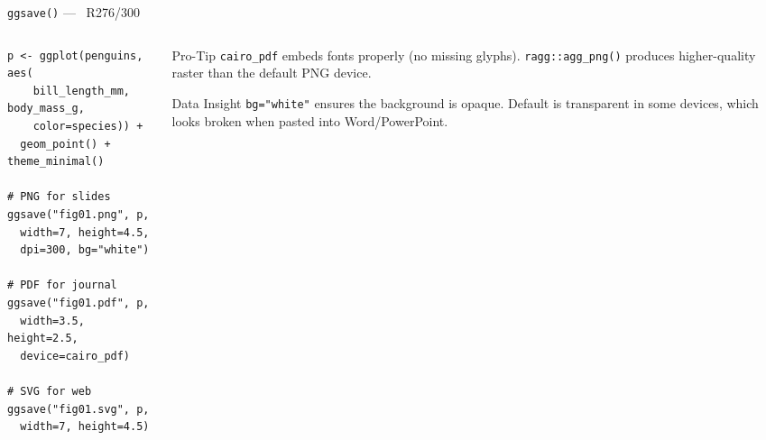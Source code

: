 \documentclass[10pt]{beamer}
\newcommand{\Rlang}{\textcolor{RAccent}{\faRProject~R}}
\newcommand{\smark}[1]{\hfill{\scriptsize\color{codegray}#1}}
\begin{document}
\begin{frame}[fragile]{\texttt{ggsave()} --- \Rlang}\smark{276/300}
\begin{columns}[T]
\begin{column}{0.55\textwidth}
\begin{lstlisting}[style=Rstyle]
p <- ggplot(penguins, aes(
    bill_length_mm, body_mass_g,
    color=species)) +
  geom_point() + theme_minimal()

# PNG for slides
ggsave("fig01.png", p,
  width=7, height=4.5,
  dpi=300, bg="white")

# PDF for journal
ggsave("fig01.pdf", p,
  width=3.5, height=2.5,
  device=cairo_pdf)

# SVG for web
ggsave("fig01.svg", p,
  width=7, height=4.5)
\end{lstlisting}
\end{column}
\begin{column}{0.42\textwidth}
\begin{alertblock}{Pro-Tip}
    \scriptsize \texttt{cairo\_pdf} embeds fonts properly (no missing glyphs). \texttt{ragg::agg\_png()} produces higher-quality raster than the default PNG device.
\end{alertblock}
\vspace{0.2cm}
\begin{exampleblock}{Data Insight}
    \scriptsize \texttt{bg="white"} ensures the background is opaque. Default is transparent in some devices, which looks broken when pasted into Word/PowerPoint.
\end{exampleblock}
\end{column}
\end{columns}
\end{frame}
\end{document}
